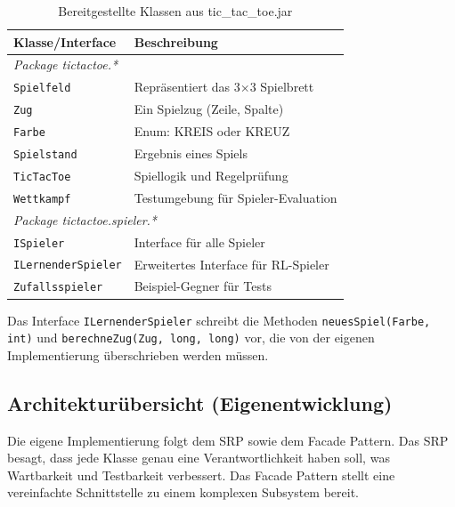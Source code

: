 \begin{table}[H]
\centering
\begin{tabular}{l|l}
\textbf{Klasse/Interface} & \textbf{Beschreibung} \\
\hline
\multicolumn{2}{l}{\textit{Package tictactoe.*}} \\
\texttt{Spielfeld} & Repräsentiert das 3$\times$3 Spielbrett \\
\texttt{Zug} & Ein Spielzug (Zeile, Spalte) \\
\texttt{Farbe} & Enum: KREIS oder KREUZ \\
\texttt{Spielstand} & Ergebnis eines Spiels \\
\texttt{TicTacToe} & Spiellogik und Regelprüfung \\
\texttt{Wettkampf} & Testumgebung für Spieler-Evaluation \\
\hline
\multicolumn{2}{l}{\textit{Package tictactoe.spieler.*}} \\
\texttt{ISpieler} & Interface für alle Spieler \\
\texttt{ILernenderSpieler} & Erweitertes Interface für RL-Spieler \\
\texttt{Zufallsspieler} & Beispiel-Gegner für Tests \\
\end{tabular}
\caption{Bereitgestellte Klassen aus tic\_tac\_toe.jar}
\end{table}

Das Interface \texttt{ILernenderSpieler} schreibt die Methoden \texttt{neuesSpiel(Farbe, int)} und \texttt{berechneZug(Zug, long, long)} vor, die von der eigenen Implementierung überschrieben werden müssen.

\subsection{Architekturübersicht (Eigenentwicklung)}

Die eigene Implementierung folgt dem \ac{SRP} sowie dem Facade Pattern. Das \ac{SRP} besagt, dass jede Klasse genau eine Verantwortlichkeit haben soll, was Wartbarkeit und Testbarkeit verbessert. Das Facade Pattern stellt eine vereinfachte Schnittstelle zu einem komplexen Subsystem bereit.

